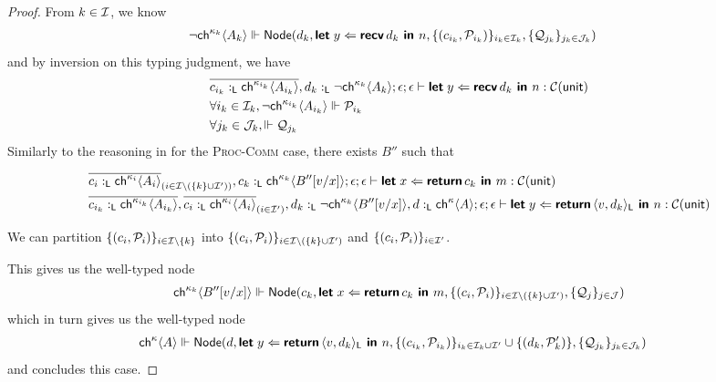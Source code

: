 \begin{proof}
  \noindent
  From $k \in \mcI$, we know
  \begin{align*}
    & \neg{\ch{\kappa_k}{A_k}} \Vdash 
      \Node{d_k}{
        \letin{y}{\recvR{d_k}}{n}
      }{
        \{ ( c_{i_k}, \mcP_{i_k} ) \}_{i_k \in \mcI_k},
        \{ \mcQ_{j_k} \}_{j_k \in \mcJ_k}
      }
  \end{align*}
  and by inversion on this typing judgment, we have
  \begin{align*}
    & \overline{c_{i_k} \tL \ch{\kappa_{i_k}}{A_{i_k}}}, d_k \tL \neg{\ch{\kappa_k}{A_k}} ; 
      \epsilon ; \epsilon \vdash
      \letin{y}{\recvR{d_k}}{n} : 
      \CM{\unit} \\
    & \forall i_k \in \mcI_k, \neg{\ch{\kappa_{i_k}}{A_{i_k}}} \Vdash \mcP_{i_k} \\
    & \forall j_k \in \mcJ_k, \Vdash \mcQ_{j_k}
  \end{align*}
  Similarly to the reasoning in  for the 
  \textsc{Proc-Comm} case, there exists $B''$ such that
  \begin{small}
  \begin{align*}
    &\overline{c_i \tL \ch{\kappa_i}{A_i}}_{(i \in \mcI \setminus (\{k\} \cup \mcI'))}, 
     c_k \tL \ch{\kappa_k}{B''[v/x]} ; \epsilon ; \epsilon \vdash 
     \letin{x}{\return{c_k}}{m} : \CM{\unit}
    \\
    &\overline{c_{i_k} \tL \ch{\kappa_{i_k}}{A_{i_k}}},
     \overline{c_i \tL \ch{\kappa_i}{A_i}}_{(i \in \mcI')},
     d_k \tL \neg{\ch{\kappa_k}{B''[v/x]}}, d \tL \ch{\kappa}{A} ; \epsilon ; \epsilon \vdash
     \letin{y}{\return{\pairR{v}{d_k}{\Ln}}}{n} : \CM{\unit}
  \end{align*}
  \end{small}

  \noindent
  We can partition $\{ ( c_i, \mcP_i ) \}_{i \in \mcI \setminus \{k\}}$ into
  $\{ ( c_i, \mcP_i ) \}_{i \in \mcI \setminus (\{ k \} \cup \mcI')}$ and
  $\{ ( c_{i}, \mcP_{i} ) \}_{i \in \mcI'}$.

  \noindent
  This gives us the well-typed node
  \begin{align*}
    \ch{\kappa_k}{B''[v/x]} \Vdash
    \Node{c_k}{
      \letin{x}{ \return{c_k} }{m} 
    }{
      \{ (c_i, \mcP_i) \}_{i \in \mcI \setminus (\{ k \} \cup \mcI')},
      \{ \mcQ_j \}_{j \in \mcJ}
    }
  \end{align*}
  which in turn gives us the well-typed node
  \begin{align*}
    &\ch{\kappa}{A} \Vdash \Node{d}{
      \letin{y}{\return{\pairR{v}{d_k}{\Ln}}}{n}
    }{
      \{ ( c_{i_k}, \mcP_{i_k} ) \}_{i_k \in \mcI_k \cup \mcI'} \cup \{ (d_k, \mcP_k') \},
      \{ \mcQ_{j_k} \}_{j_k \in \mcJ_k}
    }
  \end{align*}
  and concludes this case.


\end{proof}
